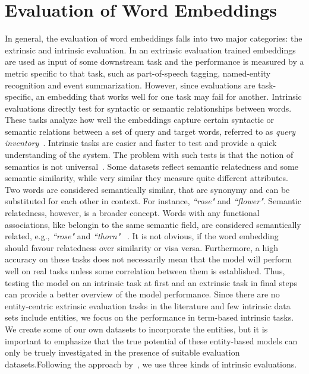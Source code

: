 \section{Evaluation of Word Embeddings}\label{sec:eval_embeddings}
In general, the evaluation of word embeddings falls into two major categories: the extrinsic and intrinsic evaluation. In an extrinsic evaluation trained embeddings are used as input of some downstream task and the performance is measured by a metric specific to that task, such as part-of-speech tagging, named-entity recognition and event summarization. However, since evaluations are task-specific, an embedding that works well for one task may fail for another. Intrinsic evaluations directly test for syntactic or semantic relationships between words. These tasks analyze how well the embeddings capture certain syntactic or semantic relations between a set of query and target words, referred to as \textit{query inventory}~. Intrinsic tasks are easier and faster to test and provide a quick understanding of the system. The problem with such tests is that the notion of semantics is not universal~. Some datasets reflect semantic relatedness and some semantic similarity, while very similar they measure quite different attributes. Two words are considered semantically similar, that are synonymy and can be substituted for each other in context. For instance, \emph{``rose"} and \emph{``flower"}. Semantic relatedness, however, is a broader concept. Words with any functional associations, like belongin to the same semantic field, are considered semantically related, e.g., \emph{``rose"} and \emph{``thorn"} ~. It is not obvious, if the word embedding should favour relatedness over similarity or visa versa. Furthermore, a high accuracy on these tasks does not necessarily mean that the model will perform well on real tasks unless some correlation between them is established. Thus, testing the model on an intrinsic task at first and an extrinsic task in final steps can provide a better overview of the model performance. Since there are no entity-centric extrinsic evaluation tasks in the literature and few intrinsic data sets include entities, we focus on the performance in term-based intrinsic tasks. We create some of our own datasets to incorporate the entities, but it is important to emphasize that the true potential of these entity-based models can only be truely investigated in the presence of suitable evaluation datasets.Following the approach by~, we use three kinds of intrinsic evaluations.
